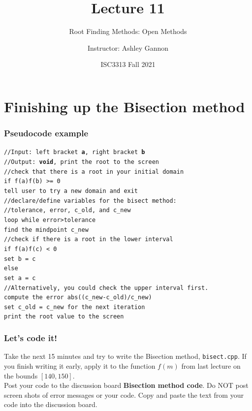 \documentclass{if-beamer}
\title[Lecture 11]{Lecture 11}
\subtitle{Root Finding Methods: Open Methods}
\author{Instructor: Ashley Gannon}
\date{ISC3313 Fall 2021}
\begin{document}
\begin{frame}
  \titlepage
\end{frame}
\section{Finishing up the Bisection method}
\begin{frame}
\frametitle{Pseudocode example}
\texttt{//Input: left bracket \textbf{a}, right bracket \textbf{b}}\\
\texttt{//Output: \textbf{void}, print the root to the screen} \\
\vspace{7pt}
\texttt{//check that there is a root in your initial domain}\\
\texttt{if f(a)f(b) >= 0} \\
\texttt{\qquad tell user to try a new domain and exit}\\
\vspace{7pt}
\texttt{//declare/define variables for the bisect method:}\\
\texttt{\qquad //tolerance, error, c\_old, and c\_new}\\
\vspace{7pt}
\texttt{loop while error>tolerance}\\
\texttt{find the mindpoint c\_new}\\
\texttt{//check if there is a root in the lower interval}\\
\texttt{\qquad if f(a)f(c) < 0}\\
\texttt{\qquad \qquad set b = c}\\
\texttt{\qquad else} \\
\texttt{\qquad \qquad set a = c} \\
\texttt{\qquad//Alternatively, you could check the upper interval first.}\\
\texttt{\qquad compute the error abs((c\_new-c\_old)/c\_new)} \\
\texttt{\qquad set c\_old = c\_new for the next iteration}\\
\texttt{print the root value to the screen}
\end{frame}

\begin{frame}
\frametitle{Let's code it!}

Take the next 15 minutes and try to write the Bisection method, \texttt{bisect.cpp}. If you finish writing it early, apply it to the function $f(m)$ from last lecture on the bounds $[140, 150]$. 
\\\vspace{7pt}
Post your code to the discussion board \textbf{Bisection method code}. Do NOT post screen shots of error messages or your code. Copy and paste the text from your code into the discussion board.

\end{frame}
\end{document}
